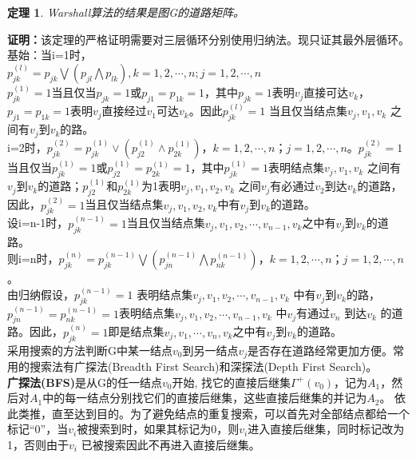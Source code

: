 \documentclass[a4paper,11pt]{book}
\newtheorem{theorem}{\textbf{定理}}[section]
\begin{document}
\begin{theorem}\K Warshall算法的结果是图G的道路矩阵。
\end{theorem}
\textbf{证明：}该定理的严格证明需要对三层循环分别使用归纳法。现只证其最外层循环。\\
基始：当i=1时，\\
$p_{jk}^{(l)}=p_{jk}\bigvee (p_{jl}\bigwedge p_{lk}),k=1,2,\cdots,n;j=1,2,\cdots,n$\\
$p_{jk}^{(1)}=1$当且仅当$p_{jk}=1$或$p_{j1}=p_{1k}=1$，其中$p_{jk}=1$表明$v_j$直接可达$v_k$，$p_{j1}=p_{1k}=1$表明$v_j$直接经过$v_1$可达$v_k$。因此$p_{jk}^{(l) }=1$ 当且仅当结点集{$v_j,v_1,v_k$ } 之间有$v_j$到$v_k$的路。\\
 \indent i=2时，$p_{jk}^{(2)}=p_{jk}^{(1)}∨(p_{j2}^{(1)}∧p_{2k}^{(1)})$，$k=1,2,\cdots,n$；$j=1,2,\cdots,n$。$p_{jk}^{(2)}=1$当且仅当$p_{jk}^{(1)}=1$或$ p_{j2}^{(1)}=p_{2k}^{(1)} =1$，其中$p_{jk}^{(1)}=1$表明结点集{$v_j,v_1,v_k$ }之间有$v_j$到$v_k$的道路；$p_{j2}^{(1)} $和$p_{2k}^{(1)}$为1表明{$v_j,v_1,v_2,v_k $} 之间$v_j$有必通过$v_2$到达$v_k$的道路，因此，$p_{jk}^{(2)}=1$当且仅当结点集{$v_j,v_1,v_2,v_k $}中有$v_j$到$v_k$的道路。\\
\indent 设i=n-1时，$p_{jk}^{(n-1)}=1$当且仅当结点集{$v_j,v_1,v_2,\cdots,v_{n-1},v_k$}之中有$v_j$到$v_k$的道路。\\
\indent 则i=n时，$p_{jk}^{(n)}=p_{jk}^{(n-1)}\bigvee(p_{jn}^{(n-1)}\bigwedge p_{nk}^{(n-1)})，k=1,2,\cdots,n；j=1,2,\cdots,n$。\\由归纳假设，$p_{jk}^{(n-1)}=1 $ 表明结点集{$v_j,v_1,v_2,\cdots,v_{n-1},v_k$ }中有$v_j$到$v_k$的路，$p_{jn}^{(n-1)}=p_{nk}^{(n-1)}=1$表明结点集{$v_j,v_1,v_2,\cdots,v_{n-1},v_k$ }中$v_j$有通过$v_n$ 到达$v_k$ 的道路。因此，$p_{jk}^{(n)}=1$即是结点集{$v_j,v_1,\cdots,v_n,v_k $}之中有$v_j$到$v_k$的道路。\\
\indent 采用搜索的方法判断G中某一结点$v_0$到另一结点$v_j$是否存在道路经常更加方便。常用的搜索法有广探法(Breadth First Search)和深探法(Depth First Search)。
\\ \indent \textbf{广探法(BFS)}是从G的任一结点$v_0$开始, 找它的直接后继集$Γ^+ (v_0)$，记为$A_1$，然后对$A_1$中的每一结点分别找它们的直接后继集，这些直接后继集的并记为$A_2$。 依此类推，直至达到目的。为了避免结点的重复搜索，可以首先对全部结点都给一个标记“0”，当$v_i$被搜索到时，如果其标记为0，则$v_i$进入直接后继集，同时标记改为1，否则由于$v_i$ 已被搜索因此不再进入直接后继集。

\end{document}
